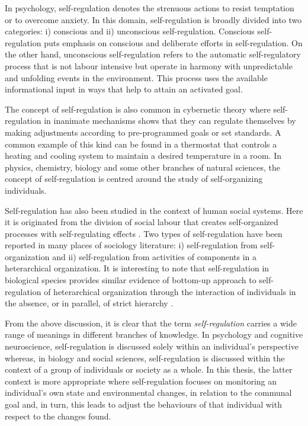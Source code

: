 In psychology, self-regulation denotes the strenuous actions to resist temptation or to overcome anxiety. In this domain, self-regulation is broadly divided into two categories: i) conscious and ii) unconscious self-regulation. Conscious self-regulation puts emphasis on conscious and deliberate efforts in self-regulation. On the other hand, unconscious self-regulation refers to the automatic self-regulatory process that is not labour intensive but operate in harmony with unpredictable and unfolding events in the environment. This process uses the available informational input in ways that help to attain an activated goal.

The concept of self-regulation is also common in cybernetic theory where self-regulation in inanimate mechanisms shows that they can regulate themselves by making adjustments according to pre-programmed goals or set standards. A common example of this kind can be found in a thermostat that controls a heating and cooling system to maintain a desired temperature in a room. In physics, chemistry, biology and some other branches of natural sciences, the concept of self-regulation is centred around the study of self-organizing individuals. 

Self-regulation has also been studied in the context of human social systems. Here it is originated from the division of social labour that creates self-organized processes with self-regulating effects \cite{Kppers+1990}. Two types of self-regulation have been reported in many places of sociology literature: i) self-regulation from self-organization and ii) self-regulation from activities of components in a heterarchical organization. It is interesting to note that self-regulation in biological species provides  similar evidence of bottom-up approach to self-regulation of heterarchical organization through the interaction of individuals in the absence, or in parallel, of strict hierarchy \cite{Beer1981}.

From the above discussion, it is clear that the term {\em self-regulation} carries a wide range of meanings in different branches of knowledge. In psychology and cognitive neuroscience, self-regulation is discussed solely within an individual's perspective whereas, in biology and social sciences, self-regulation is discussed within the context of a group of individuals or society as a whole. In  this thesis, the latter context is more appropriate where  self-regulation focuses on monitoring an individual's own state and environmental changes, in relation to the communal goal and, in turn, this leads to adjust the behaviours of that individual with respect to the changes found.
